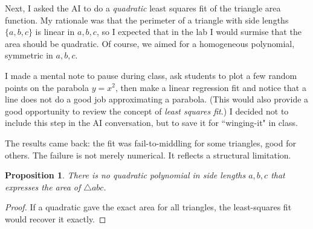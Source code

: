 \documentclass[10.5pt]
{amsart}
\newtheorem*{proposition}{Proposition}
\begin{document}
Next, I asked the AI to do a \emph{quadratic} least squares fit of the triangle area function. My rationale was that the perimeter of a triangle with side lengths $\{a, b, c\}$ is linear in $a, b, c$, so I expected that in the lab I would surmise that the area should be quadratic. Of course, we aimed for a homogeneous polynomial, symmetric in $a,b,c$.

\begin{quoting}[leftmargin=0.5em, rightmargin=0.5em]
{\footnotesize I made a mental note to pause during class, ask students to plot a few random points on the parabola $y=x^2$, then make a linear regression fit and notice that a line does not do a good job approximating a parabola. (This would also provide a good opportunity to review the concept of \emph{least squares fit}.) I decided not to include this step in the AI conversation, but to save it for ``winging-it" in class. \par}
\end{quoting}

The results came back: the fit was fail-to-middling for some triangles, good for others. The failure is not merely numerical. It reflects a structural limitation.

\begin{proposition}
There is no quadratic polynomial in side lengths $a,b,c$ that expresses the area of $\triangle abc$.
\end{proposition}
\begin{proof}
If a quadratic gave the exact area for all triangles, the least-squares fit would recover it exactly.
\end{proof}
\end{document}
